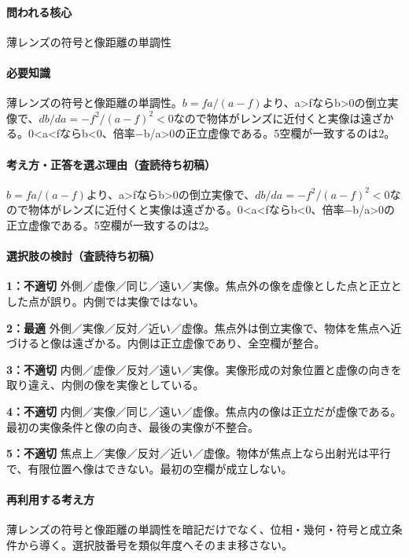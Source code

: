 \paragraph{問われる核心} 薄レンズの符号と像距離の単調性

\paragraph{必要知識} 薄レンズの符号と像距離の単調性。\(b=fa/(a-f)\)より、a>fならb>0の倒立実像で、\(db/da=-f^2/(a-f)^2<0\)なので物体がレンズに近付くと実像は遠ざかる。0<a<fならb<0、倍率−b/a>0の正立虚像である。5空欄が一致するのは2。

\paragraph{考え方・正答を選ぶ理由（査読待ち初稿）} \(b=fa/(a-f)\)より、a>fならb>0の倒立実像で、\(db/da=-f^2/(a-f)^2<0\)なので物体がレンズに近付くと実像は遠ざかる。0<a<fならb<0、倍率−b/a>0の正立虚像である。5空欄が一致するのは2。

\paragraph{選択肢の検討（査読待ち初稿）}\mbox{}\par

\noindent\textbf{1：不適切} 外側／虚像／同じ／遠い／実像。焦点外の像を虚像とした点と正立とした点が誤り。内側では実像ではない。\par

\noindent\textbf{2：最適} 外側／実像／反対／近い／虚像。焦点外は倒立実像で、物体を焦点へ近づけると像は遠ざかる。内側は正立虚像であり、全空欄が整合。\par

\noindent\textbf{3：不適切} 内側／虚像／反対／遠い／実像。実像形成の対象位置と虚像の向きを取り違え、内側の像を実像としている。\par

\noindent\textbf{4：不適切} 内側／実像／同じ／遠い／虚像。焦点内の像は正立だが虚像である。最初の実像条件と像の向き、最後の実像が不整合。\par

\noindent\textbf{5：不適切} 焦点上／実像／反対／近い／虚像。物体が焦点上なら出射光は平行で、有限位置へ像はできない。最初の空欄が成立しない。\par

\paragraph{再利用する考え方} 薄レンズの符号と像距離の単調性を暗記だけでなく、位相・幾何・符号と成立条件から導く。選択肢番号を類似年度へそのまま移さない。

